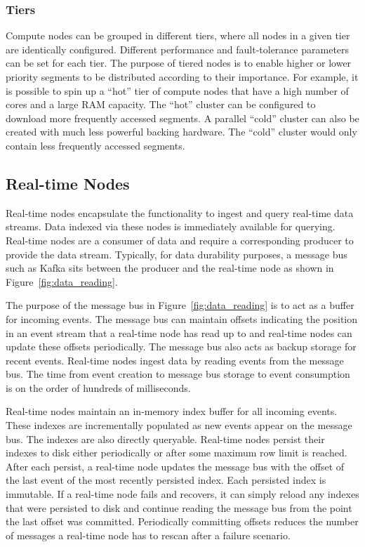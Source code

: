 \documentclass{vldb}
\begin{document}
\subsubsection{Tiers}
\label{sec:tiers}
Compute nodes can be grouped in different tiers, where all nodes in a
given tier are identically configured. Different performance and
fault-tolerance parameters can be set for each tier. The purpose of
tiered nodes is to enable higher or lower priority segments to be
distributed according to their importance. For example, it is possible
to spin up a “hot” tier of compute nodes that have a high number of
cores and a large RAM capacity. The “hot” cluster can be configured to
download more frequently accessed segments. A parallel “cold” cluster
can also be created with much less powerful backing hardware. The
“cold” cluster would only contain less frequently accessed segments.

\subsection{Real-time Nodes}
\label{sec:realtime}
Real-time nodes encapsulate the functionality to ingest and query
real-time data streams. Data indexed via these nodes is immediately
available for querying. Real-time nodes are a consumer of data and
require a corresponding producer to provide the data
stream. Typically, for data durability purposes, a message bus such as
Kafka \cite{kreps2011kafka} sits between the producer and the real-time node as shown
in Figure~\ref{fig:data_reading}.

The purpose of the message bus in Figure~\ref{fig:data_reading} is to act as a buffer for
incoming events. The message bus can maintain offsets indicating the
position in an event stream that a real-time node has read up to and
real-time nodes can update these offsets periodically. The message bus also acts as backup storage for recent events.
Real-time nodes ingest data by reading events from the message bus. The time from event creation to message bus storage to
event consumption is on the order of hundreds of milliseconds.

Real-time nodes maintain an in-memory index buffer for all incoming
events. These indexes are incrementally populated as new events appear on the message bus. The indexes are also directly queryable.
Real-time nodes persist their indexes to disk either periodically or after some maximum row limit is
reached. After each persist, a real-time node updates the message bus
with the offset of the last event of the most recently persisted
index. Each persisted index is immutable. If a real-time node fails and recovers, it can simply reload
any indexes that were persisted to disk and continue reading the
message bus from the point the last offset was committed. Periodically committing offsets reduces the number of messages a real-time
node has to rescan after a failure scenario.
\end{document}
